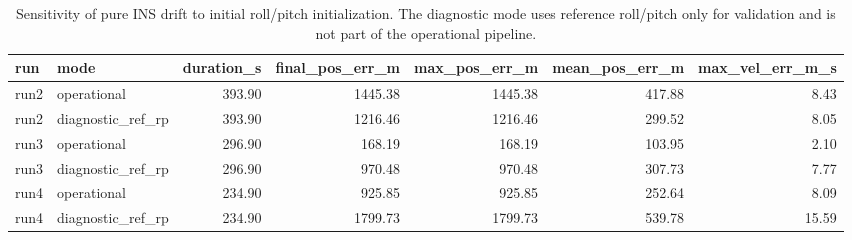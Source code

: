 \begin{table}
\caption{Sensitivity of pure INS drift to initial roll/pitch initialization. The diagnostic mode uses reference roll/pitch only for validation and is not part of the operational pipeline.}
\label{tab:initial_attitude_sensitivity}
\begin{tabular}{llrrrrr}
\toprule
run & mode & duration_s & final_pos_err_m & max_pos_err_m & mean_pos_err_m & max_vel_err_m_s \\
\midrule
run2 & operational & 393.90 & 1445.38 & 1445.38 & 417.88 & 8.43 \\
run2 & diagnostic_ref_rp & 393.90 & 1216.46 & 1216.46 & 299.52 & 8.05 \\
run3 & operational & 296.90 & 168.19 & 168.19 & 103.95 & 2.10 \\
run3 & diagnostic_ref_rp & 296.90 & 970.48 & 970.48 & 307.73 & 7.77 \\
run4 & operational & 234.90 & 925.85 & 925.85 & 252.64 & 8.09 \\
run4 & diagnostic_ref_rp & 234.90 & 1799.73 & 1799.73 & 539.78 & 15.59 \\
\bottomrule
\end{tabular}
\end{table}
